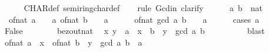 \begin{isabellebody}
\ \ \ \ \isamarkupfalse%
\ CHAR{\isacharunderscore}{\kern0pt}def\ semiring{\isacharunderscore}{\kern0pt}char{\isacharunderscore}{\kern0pt}def\isanewline
\ \ \isamarkupfalse%
\ {\isacharparenleft}{\kern0pt}rule\ Gcd{\isacharunderscore}{\kern0pt}in{\isacharcomma}{\kern0pt}\ clarify{\isacharparenright}{\kern0pt}\isanewline
\ \ \ \ \isamarkupfalse%
\ a\ b\ {\isacharcolon}{\kern0pt}{\isacharcolon}{\kern0pt}\ nat\isanewline
\ \ \ \ \isamarkupfalse%
\ {\isacharasterisk}{\kern0pt}{\isacharcolon}{\kern0pt}\ {\isachardoublequoteopen}of{\isacharunderscore}{\kern0pt}nat\ a\ {\isacharequal}{\kern0pt}\ {\isacharparenleft}{\kern0pt}{}\ {\isacharcolon}{\kern0pt}{\isacharcolon}{\kern0pt}\ {\isacharprime}{\kern0pt}a{\isacharparenright}{\kern0pt}{\isachardoublequoteclose}\ {\isachardoublequoteopen}of{\isacharunderscore}{\kern0pt}nat\ b\ {\isacharequal}{\kern0pt}\ {\isacharparenleft}{\kern0pt}{}\ {\isacharcolon}{\kern0pt}{\isacharcolon}{\kern0pt}\ {\isacharprime}{\kern0pt}a{\isacharparenright}{\kern0pt}{\isachardoublequoteclose}\isanewline
\ \ \ \ \isamarkupfalse%
\ {\isachardoublequoteopen}of{\isacharunderscore}{\kern0pt}nat\ {\isacharparenleft}{\kern0pt}gcd\ a\ b{\isacharparenright}{\kern0pt}\ {\isacharequal}{\kern0pt}\ {\isacharparenleft}{\kern0pt}{}\ {\isacharcolon}{\kern0pt}{\isacharcolon}{\kern0pt}\ {\isacharprime}{\kern0pt}a{\isacharparenright}{\kern0pt}{\isachardoublequoteclose}\isanewline
\ \ \ \ \isamarkupfalse%
\ {\isacharparenleft}{\kern0pt}cases\ {\isachardoublequoteopen}a\ {\isacharequal}{\kern0pt}\ {}{\isachardoublequoteclose}{\isacharparenright}{\kern0pt}\isanewline
\ \ \ \ \ \ \isamarkupfalse%
\ False\isanewline
\ \ \ \ \ \ \isamarkupfalse%
\ bezout{\isacharunderscore}{\kern0pt}nat\ \isamarkupfalse%
\ x\ y\ \ {\isachardoublequoteopen}a\ {\isacharasterisk}{\kern0pt}\ x\ {\isacharequal}{\kern0pt}\ b\ {\isacharasterisk}{\kern0pt}\ y\ {\isacharplus}{\kern0pt}\ gcd\ a\ b{\isachardoublequoteclose}\isanewline
\ \ \ \ \ \ \ \ \isamarkupfalse%
\ blast\isanewline
\ \ \ \ \ \ \isamarkupfalse%
\ {\isachardoublequoteopen}of{\isacharunderscore}{\kern0pt}nat\ {\isacharparenleft}{\kern0pt}a\ {\isacharasterisk}{\kern0pt}\ x{\isacharparenright}{\kern0pt}\ {\isacharequal}{\kern0pt}\ {\isacharparenleft}{\kern0pt}of{\isacharunderscore}{\kern0pt}nat\ {\isacharparenleft}{\kern0pt}b\ {\isacharasterisk}{\kern0pt}\ y\ {\isacharplus}{\kern0pt}\ gcd\ a\ b{\isacharparenright}{\kern0pt}\ {\isacharcolon}{\kern0pt}{\isacharcolon}{\kern0pt}\ {\isacharprime}{\kern0pt}a{\isacharparenright}{\kern0pt}{\isachardoublequoteclose}\isanewline

\end{isabellebody}
